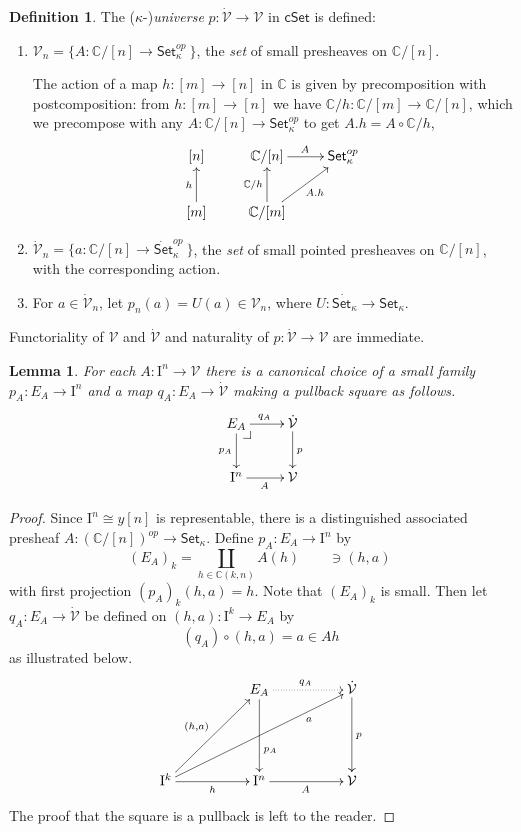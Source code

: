 \documentclass[12pt]{article}
\makeatletter
\newcommand{\C}{\ensuremath{\mathbb{C}}}
\newcommand{\Set}{\ensuremath{\mathsf{Set}}}
\newcommand{\cSet}{\ensuremath{\mathsf{cSet}}}
\newcommand{\pbcorner}[1][dr]{\save*!/#1-1.2pc/#1:(-1,1)@^{|-}\restore}
\newcommand{\ra}{\ensuremath{\rightarrow}}
\newcommand{\I}{\ensuremath{\mathrm{I}}}
\newcommand{\V}{\ensuremath{\mathcal{V}}}
\newcommand{\VV}{\ensuremath{\dot{\mathcal{V}}}}
\newtheorem{lemma}[theorem]{Lemma}
\theoremstyle{remark}
\theoremstyle{definition}
\newtheorem{definition}[theorem]{Definition}
\makeatother
\begin{document}
\begin{definition}
The ($\kappa$-)\emph{universe} $p : \VV \ra \V$ in $\cSet$ is defined:
\begin{enumerate}

\item $\V_n = \{ A: \C/[n] \ra \Set^{op}_\kappa\ \}$, the \emph{set} of small presheaves on $\C/[n]$.  

The action of a map $h : [m] \ra [n]$ in  $\C$  is given by precomposition with postcomposition: from  $h : [m] \ra [n]$ we have  $\C/h : \C/[m] \ra \C/[n]$, which we precompose with any $A: \C/[n]\ra \Set_\kappa^{op} $ to get $A.h = A\circ \C/h$,
\begin{equation}\label{diagram:U1}
\xymatrix{
[n] & \C/[n] \ar[r]^{A} & \Set_\kappa^{op} \\
[m] \ar[u]^{h} & \C/[m] \ar[u]^{\C/h}  \ar[ru]_{A.h} &
}
\end{equation}

\item $\VV_n = \{ a: \C/[n] \ra \dot{\Set}^{op}_\kappa\ \}$, the \emph{set} of small pointed presheaves on $\C/[n]$, with the corresponding action.

\item For $a \in \VV_n$, let $p_n (a) = U(a) \in \V_n$, where $U : \dot{\Set_\kappa} \ra {\Set_\kappa}$.
\end{enumerate}
\end{definition}
Functoriality of $\V$ and $\VV$ and naturality of $p: \VV\ra\V$ are immediate. 

\begin{lemma}
For each $A : \I^n \ra \V$ there is a canonical choice of a small family $p_A : E_A\ra \I^n$ and a map $q_A: E_A \ra\VV$ making a pullback square as follows.
\begin{equation}\label{diagram:U2}
\xymatrix{
E_A \ar[d]_{p_A} \ar[r]^{q_A}  \pbcorner& \VV\ar[d]^{p}  \\
\I^n \ar[r]_{A} & \V
}
\end{equation}
\end{lemma}
%
\begin{proof}
Since $\I^n \cong y[n]$ is representable, there is a distinguished associated presheaf $A : (\C/[n])^{op} \ra \Set_\kappa$. Define $p_A : E_A \ra \I^n$ by
\[
(E_A)_k = \coprod_{h\in \C(k,n)} A(h) \qquad \ni (h, a)\,
\]
with first projection $(p_A)_k(h,a) = h$. Note that $(E_A)_k$ is small.
Then let $q_A:E_A \ra\VV$ be defined on $(h,a): \I^k \ra E_A$ by 
\[
(q_A)\circ(h, a) = a \in Ah
\]
as illustrated below.
\begin{equation}\label{diagram:U3}
\xymatrix@=5em{
& E_A \ar[d]^>>>>>>{p_A} \ar@{..>}[r]^{q_A} & \VV\ar[d]^{p}  \\
\I^k \ar[r]_{h} \ar[ru]^{(h,a)}\ar[rru]_>>>>>>>>>>>{a} & \I^n \ar[r]_{A} & \V
}
\end{equation}
The proof that the square is a pullback is left to the reader.
\end{proof}
\end{document}
